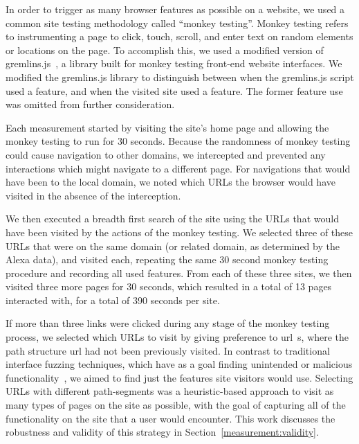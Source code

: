 In order to trigger as many browser features as possible on a website, we used
a common site testing methodology called ``monkey testing''.  Monkey testing
refers to instrumenting a page to click, touch, scroll, and enter text on
random elements or locations on the page.  To accomplish this, we used a
modified version of gremlins.js~\cite{zaninotto2016gremlins}, a library built
for monkey testing front-end website interfaces.  We modified the gremlins.js
library to distinguish between when the gremlins.js script used a
feature, and when the visited site used a feature.  The former feature
use was omitted from further consideration.

Each measurement started by visiting the site's home page and allowing
the monkey testing to run for 30 seconds.  Because the randomness of monkey
testing could cause navigation to other domains, we intercepted and prevented
any interactions which might navigate to a different page.  For
navigations that would have been to the local domain, we noted which URLs the
browser would have visited in the absence of the interception.

We then executed a breadth first search of the site using the
URLs that would have been visited by the actions of the monkey
testing.  We selected three of these URLs that were on the same domain (or
related domain, as determined by the Alexa data), and visited each, repeating
the same 30 second monkey testing procedure and recording all used features.
From each of these three sites, we then visited three more pages for 30 seconds,
which resulted in a total of 13 pages interacted with, for a total of 390
seconds per site.

If more than three links were clicked during any stage of the monkey testing
process, we selected which URLs to visit by giving preference to \gls{url}~s,
where the path structure \gls{url} had not been previously visited. In contrast
to traditional interface fuzzing techniques, which have as a goal finding
unintended or malicious functionality~\cite{amalfitano2012using,liu2014decaf},
we aimed to find just the features site visitors would use. Selecting URLs with
different path-segments was a heuristic-based approach to visit as many types
of pages on the site as possible, with the goal of capturing all of the
functionality on the site that a user would encounter.  This work discusses the
robustness and validity of this strategy in Section~\ref{measurement:validity}.


